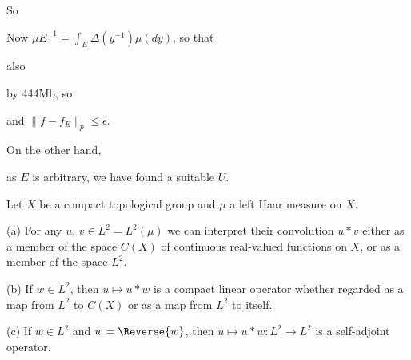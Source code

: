 {So


\noindent Now $\mu E^{-1}=\int_E\Delta(y^{-1})\mu(dy)$, so that


\noindent also


\noindent by 444Mb, so


\noindent and $\|f-f_E\|_p\le\epsilon$.

On the other hand,


\noindent as $E$ is arbitrary, we have found a suitable $U$.
}%

  Let $X$ be a compact topological group and $\mu$
a left Haar measure on $X$.

(a) For any $u$, $v\in L^2=L^2(\mu)$ we can interpret their convolution
$u*v$ either as a member of the space $C(X)$ of continuous real-valued
functions on $X$, or as a member of the space $L^2$.

(b) If $w\in L^2$, then $u\mapsto u*w$ is a compact linear operator
whether regarded as a map from $L^2$ to $C(X)$ or as a map from $L^2$ to
itself.

(c) If $w\in L^2$ and $w=\Reverse{w}$, then
$u\mapsto u*w:L^2\to L^2$ is a self-adjoint operator.

